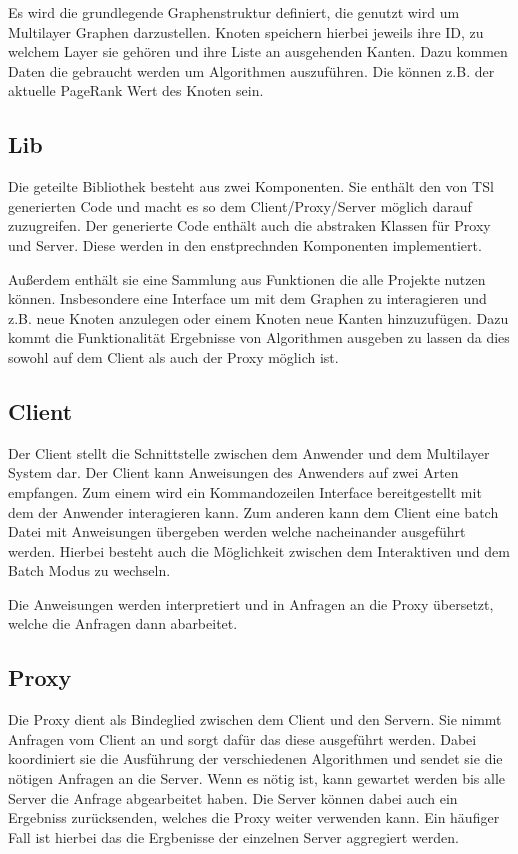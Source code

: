 Es wird die grundlegende Graphenstruktur definiert, die genutzt wird um Multilayer Graphen darzustellen. Knoten speichern hierbei jeweils ihre ID, zu welchem Layer sie gehören
und ihre Liste an ausgehenden Kanten. Dazu kommen Daten die gebraucht werden um Algorithmen auszuführen. Die können z.B. der aktuelle PageRank Wert des Knoten sein.


\subsection{Lib}

Die geteilte Bibliothek besteht aus zwei Komponenten. Sie enthält den von TSl generierten Code und macht es so dem Client/Proxy/Server möglich darauf zuzugreifen. Der generierte Code enthält auch die abstraken Klassen für Proxy und Server. Diese werden in den enstprechnden Komponenten implementiert. 

Außerdem enthält sie eine Sammlung aus Funktionen die alle Projekte nutzen können. Insbesondere eine Interface um mit dem Graphen zu interagieren und z.B. neue Knoten anzulegen oder einem Knoten neue Kanten hinzuzufügen.
Dazu kommt die Funktionalität Ergebnisse von Algorithmen ausgeben zu lassen da dies sowohl auf dem Client als auch der Proxy möglich ist.


\subsection{Client}

Der Client stellt die Schnittstelle zwischen dem Anwender und dem Multilayer System dar. Der Client kann Anweisungen des Anwenders auf zwei Arten empfangen.
Zum einem wird ein Kommandozeilen Interface bereitgestellt mit dem der Anwender interagieren kann. Zum anderen kann dem Client eine batch Datei mit Anweisungen übergeben werden
welche nacheinander ausgeführt werden.
Hierbei besteht auch die Möglichkeit zwischen dem Interaktiven und dem Batch Modus zu wechseln.

Die Anweisungen werden interpretiert und in Anfragen an die Proxy übersetzt, welche die Anfragen dann abarbeitet.

\subsection{Proxy}

Die Proxy dient als Bindeglied zwischen dem Client und den Servern. Sie nimmt Anfragen vom Client an und sorgt dafür das diese ausgeführt werden.
Dabei koordiniert sie die Ausführung der verschiedenen Algorithmen und sendet sie die nötigen Anfragen an die Server. Wenn es nötig ist, kann gewartet werden 
bis alle Server die Anfrage abgearbeitet haben. Die Server können dabei auch ein Ergebniss zurücksenden, welches die Proxy weiter verwenden kann. Ein häufiger Fall
ist hierbei das die Ergbenisse der einzelnen Server aggregiert werden.


